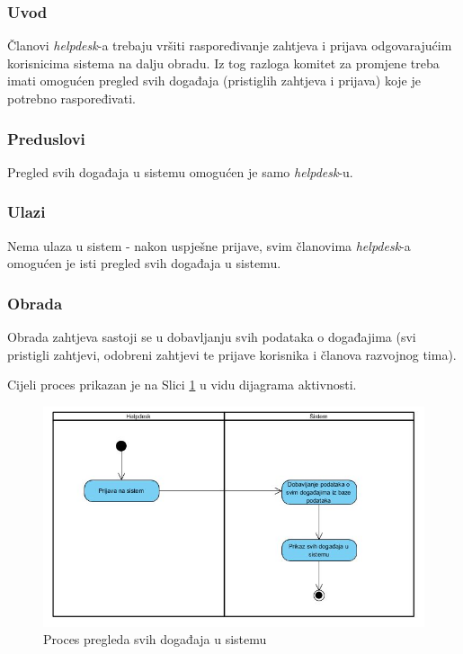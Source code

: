 \documentclass[12pt,a4paper]{article}
\begin{document}
\subsubsection{Uvod}

Članovi \textit{helpdesk}-a trebaju vršiti raspoređivanje zahtjeva i prijava odgovarajućim korisnicima sistema na dalju obradu. Iz tog razloga komitet za promjene treba imati omogućen pregled svih događaja (pristiglih zahtjeva i prijava) koje je potrebno raspoređivati.

\subsubsection{Preduslovi}

Pregled svih događaja u sistemu omogućen je samo \textit{helpdesk}-u.

\subsubsection{Ulazi}

Nema ulaza u sistem - nakon uspješne prijave, svim članovima \textit{helpdesk}-a omogućen je isti pregled svih događaja u sistemu.

\subsubsection{Obrada}

Obrada zahtjeva sastoji se u dobavljanju svih podataka o događajima (svi pristigli zahtjevi, odobreni zahtjevi te prijave korisnika i članova razvojnog tima).

Cijeli proces prikazan je na Slici \ref{act9} u vidu dijagrama aktivnosti.

\begin{figure}[H]
\center
\includegraphics[scale=0.5]{../res/Activity/activity9.JPG}
\caption{Proces pregleda svih događaja u sistemu}
\label{act9}
\end{figure}
\end{document}
